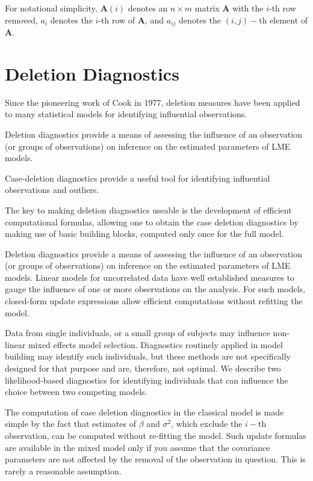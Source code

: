 \documentclass[12pt, a4paper]{report}
\theoremstyle{plain}
\theoremstyle{definition}
\theoremstyle{remark}
\begin{document}
For notational simplicity, $\boldsymbol{A}(i)$ denotes an $n \times m$ matrix $\boldsymbol{A}$ with the $i$-th row
removed, $a_i$ denotes the $i$-th row of $\boldsymbol{A}$, and $a_{ij}$ denotes the $(i, j)-$th element of $\boldsymbol{A}$.

\section{Deletion Diagnostics}

Since the pioneering work of Cook in 1977, deletion measures have been applied to many statistical models for identifying influential observations.

Deletion diagnostics provide a means of assessing the influence of an observation (or groups of observations) on inference on the estimated parameters of LME models.

Case-deletion diagnostics provide a useful tool for identifying influential observations and outliers.


The key to making deletion diagnostics useable is the development of efficient computational formulas, allowing one to obtain the  case deletion diagnostics by making use of basic building blocks, computed only once for the full model.

Deletion diagnostics provide a means of assessing the influence of an observation (or groups of observations) on inference on the estimated parameters of LME models. Linear models for uncorrelated data have well established measures to gauge the influence of one or more observations on the analysis. For such models, closed-form update expressions allow efficient computations without refitting the model.

Data from single individuals, or a small group of subjects may influence non-linear mixed effects model selection. Diagnostics routinely applied in model building may identify such individuals, but these methods are not specifically designed for that purpose and are, therefore, not optimal. We describe two likelihood-based diagnostics for identifying individuals that can influence the choice between two competing models.


The computation of case deletion diagnostics in the classical model is made simple by the fact that estimates of $\beta$ and $\sigma^2$, which exclude the $i-$th observation, can be computed without re-fitting the model. Such update formulas are available in the mixed model only if you assume that the covariance parameters are not affected by the removal of the observation in question. This is rarely a reasonable assumption.
\end{document}
